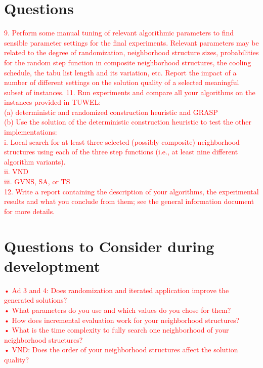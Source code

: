 \section{Questions}

\textcolor{red}{
9. Perform some manual tuning of relevant algorithmic parameters to find sensible parameter settings
for the final experiments. Relevant parameters may be related to the degree of randomization,
neighborhood structure sizes, probabilities for the random step function in composite neighborhood
structures, the cooling schedule, the tabu list length and its variation, etc. Report the impact of a
number of different settings on the solution quality of a selected meaningful subset of instances.
11. Run experiments and compare all your algorithms on the instances provided in TUWEL:\\
(a) deterministic and randomized construction heuristic and GRASP\\
(b) Use the solution of the deterministic construction heuristic to test the other implementations:\\
i. Local search for at least three selected (possibly composite) neighborhood structures using
each of the three step functions (i.e., at least nine different algorithm variants).\\
ii. VND\\
iii. GVNS, SA, or TS\\
12. Write a report containing the description of your algorithms, the experimental results and what
you conclude from them; see the general information document for more details.}

\pagebreak

\section{Questions to Consider during developtment}

\textcolor{red}{
• Ad 3 and 4: Does randomization and iterated application improve the generated solutions?\\
• What parameters do you use and which values do you chose for them?\\
• How does incremental evaluation work for your neighborhood structures?\\
• What is the time complexity to fully search one neighborhood of your neighborhood structures?\\
• VND: Does the order of your neighborhood structures affect the solution quality?}